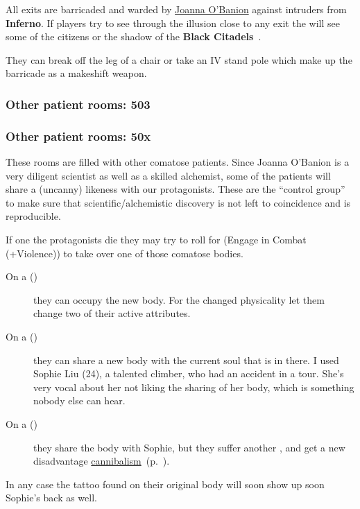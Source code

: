 \documentclass[bg-full]{resources/stylesheets/kult}
\begin{document}
All exits are barricaded and warded by \hyperref[ssub:joanna_o_banion]{Joanna O'Banion} against intruders from \textbf{Inferno}.
If players try to see through the illusion close to any exit the will see some of the citizens or the shadow of the
\textbf{Black Citadels}~\cite[p.316]{KULT:core}.

They can break off the leg of a chair or take an IV stand pole which make up the barricade as a makeshift weapon.

\subsubsection{Other patient rooms: 503}%
\label{ssub:other_patient_rooms_503}

\subsubsection{Other patient rooms: 50x}%
\label{ssub:other_patient_rooms}
These rooms are filled with other comatose patients.  Since Joanna O'Banion is a very diligent scientist as well as a skilled
alchemist, some of the patients will share a (uncanny) likeness with our protagonists.  These are the “control group” to make
sure that scientific/alchemistic discovery is not left to coincidence and is reproducible.

If one the protagonists die they may try to roll for \bluebf(Engage in Combat (+Violence)) to take over one of those comatose
bodies.

\begin{description}
  \item[On a ()] they can occupy the new body.  For the changed physicality let them change two of their active
        attributes.
  \item[On a ()] they can share a new body with the current soul that is in there.  I used Sophie Liu (24), a
        talented climber, who had an accident in a tour.  She's very vocal about her not liking the sharing of her body, which is
        something nobody else can hear.
  \item[On a ()] they share the body with Sophie, but they suffer another , and get a new
        disadvantage \hyperref[disadv:cannibalism]{cannibalism}~(p.~\pageref{disadv:cannibalism}).
\end{description}

In any case the tattoo found on their original body will soon show up soon Sophie's back as well.
\end{document}
